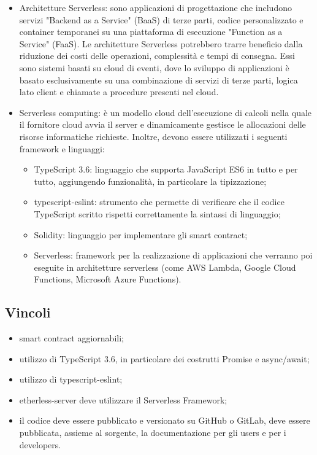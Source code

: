 \begin{itemize}
\item Architetture Serverless: sono applicazioni di progettazione che includono servizi "Backend as a Service" (BaaS) di terze parti, codice personalizzato e container temporanei su una piattaforma di esecuzione "Function as a Service" (FaaS). Le architetture Serverless potrebbero trarre beneficio dalla riduzione dei costi delle operazioni, complessit\`a e tempi di consegna. Essi sono sistemi basati su cloud di eventi, dove lo sviluppo di applicazioni \`e basato esclusivamente su una combinazione di servizi di terze parti, logica lato client e chiamate a procedure presenti nel cloud.
\item Serverless computing: \`e un modello cloud dell'esecuzione di calcoli nella quale il fornitore cloud avvia il server e dinamicamente gestisce le allocazioni delle risorse informatiche richieste.
Inoltre, devono essere utilizzati i seguenti framework e linguaggi:
\begin{itemize}
\item TypeScript 3.6: linguaggio che supporta JavaScript ES6 in tutto e per tutto, aggiungendo
funzionalit\`a, in particolare la tipizzazione;
\item typescript-eslint: strumento che permette di verificare che il codice TypeScript scritto rispetti
correttamente la sintassi di linguaggio;
\item Solidity: linguaggio per implementare gli smart contract;
\item Serverless: framework per la realizzazione di applicazioni che verranno poi eseguite in architetture serverless (come AWS Lambda, Google Cloud Functions, Microsoft Azure Functions).
\end{itemize}

\end{itemize}

\subsection{Vincoli}
\begin{itemize}
\item smart contract aggiornabili;
\item utilizzo di TypeScript 3.6, in particolare dei costrutti Promise e async/await;
\item utilizzo di typescript-eslint;
\item etherless-server deve utilizzare il Serverless Framework;
\item il codice deve essere pubblicato e versionato su GitHub o GitLab, deve essere pubblicata, assieme al sorgente, la documentazione per gli users e per i developers.
\end{itemize}

